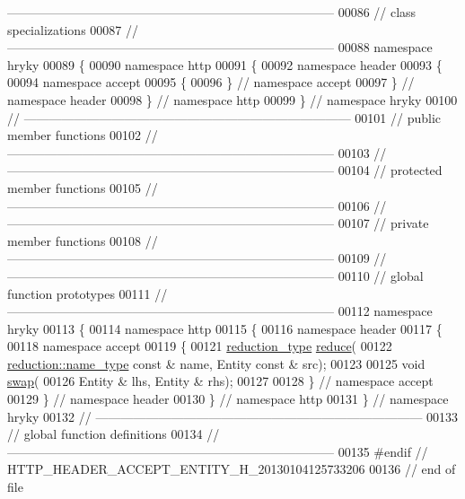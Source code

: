 \begin{DoxyCode}
{      ------------------------------------------------------------------------------}
00086 \textcolor{comment}{// class specializations}
00087 \textcolor{comment}{//
      ------------------------------------------------------------------------------}
00088 \textcolor{keyword}{namespace }hryky
00089 \{
00090 \textcolor{keyword}{namespace }http
00091 \{
00092 \textcolor{keyword}{namespace }header
00093 \{
00094 \textcolor{keyword}{namespace }accept
00095 \{
00096 \} \textcolor{comment}{// namespace accept}
00097 \} \textcolor{comment}{// namespace header}
00098 \} \textcolor{comment}{// namespace http}
00099 \} \textcolor{comment}{// namespace hryky}
00100 \textcolor{comment}{//
      ------------------------------------------------------------------------------}
00101 \textcolor{comment}{// public member functions}
00102 \textcolor{comment}{//
      ------------------------------------------------------------------------------}
00103 \textcolor{comment}{//
      ------------------------------------------------------------------------------}
00104 \textcolor{comment}{// protected member functions}
00105 \textcolor{comment}{//
      ------------------------------------------------------------------------------}
00106 \textcolor{comment}{//
      ------------------------------------------------------------------------------}
00107 \textcolor{comment}{// private member functions}
00108 \textcolor{comment}{//
      ------------------------------------------------------------------------------}
00109 \textcolor{comment}{//
      ------------------------------------------------------------------------------}
00110 \textcolor{comment}{// global function prototypes}
00111 \textcolor{comment}{//
      ------------------------------------------------------------------------------}
00112 \textcolor{keyword}{namespace }hryky
00113 \{
00114 \textcolor{keyword}{namespace }http
00115 \{
00116 \textcolor{keyword}{namespace }header
00117 \{
00118 \textcolor{keyword}{namespace }accept
00119 \{
00121     \hyperlink{namespacehryky_a343a9a4c36a586be5c2693156200eadc}{reduction_type} \hyperlink{namespacehryky_1_1http_a08fc36a78a8e2908140fcd102829a566}{reduce}(
00122         \hyperlink{namespacehryky_1_1reduction_ac686c30a4c8d196bbd0f05629a6b921f}{reduction::name_type} \textcolor{keyword}{const} & name, Entity \textcolor{keyword}{const} & src);
00123 
00125     \textcolor{keywordtype}{void} \hyperlink{namespacehryky_1_1http_a38e62595ad532d18fbc65ceb61973aec}{swap}(
00126         Entity & lhs, Entity & rhs);
00127 
00128 \} \textcolor{comment}{// namespace accept}
00129 \} \textcolor{comment}{// namespace header}
00130 \} \textcolor{comment}{// namespace http}
00131 \} \textcolor{comment}{// namespace hryky}
00132 \textcolor{comment}{//
      ------------------------------------------------------------------------------}
00133 \textcolor{comment}{// global function definitions}
00134 \textcolor{comment}{//
      ------------------------------------------------------------------------------}
00135 \textcolor{preprocessor}{#endif // HTTP\_HEADER\_ACCEPT\_ENTITY\_H\_20130104125733206}
00136 \textcolor{preprocessor}{}\textcolor{comment}{// end of file}
\end{DoxyCode}
